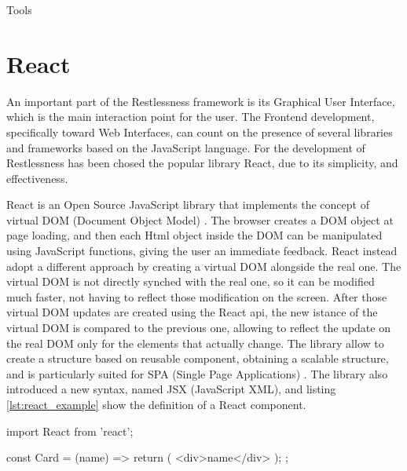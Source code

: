 \begin{chapter}{Tools}
    \section{React}
    An important part of the Restlessness framework is its Graphical User Interface,
    which is the main interaction point for the user. The Frontend development,
    specifically toward Web Interfaces, can count on the presence of several
    libraries and frameworks based on the JavaScript language. For the development
    of Restlessness has been chosed the popular library React, due to its simplicity,
    and effectiveness.

    React is an Open Source JavaScript library that implements the concept of
    virtual DOM (Document Object Model) \cite{dom_standard}. The browser creates
    a DOM object at page loading, and then each Html object inside the DOM can be
    manipulated using JavaScript functions, giving the user an immediate feedback.
    React instead adopt a different approach by creating a virtual DOM alongside
    the real one. The virtual DOM is not directly synched with the real one, so
    it can be modified much faster, not having to reflect those modification on
    the screen. After those virtual DOM updates are created using the React api,
    the new istance of the virtual DOM is compared to the previous one, allowing
    to reflect the update on the real DOM only for the elements that actually
    change. The library allow to create a structure based on reusable component,
    obtaining a scalable structure, and is particularly suited for SPA (Single
    Page Applications) \cite{react_js}.
    The library also introduced a new syntax, named JSX (JavaScript XML), and
    listing \ref{lst:react_example} show the definition of a React component.

    \bigskip
    \begin{code}[caption= React component definition,label={lst:react_example}]
import React from 'react';

const Card = ({name}) => {
  return (
      <div>{name}</div>
  );
};
    \end{code}

\end{chapter}